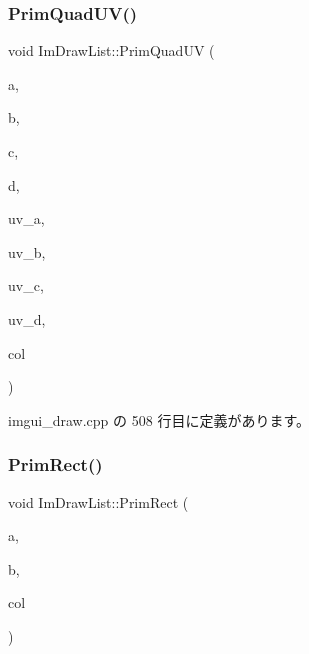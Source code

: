 \subsubsection{\texorpdfstring{Prim\+Quad\+U\+V()}{PrimQuadUV()}}
{\footnotesize\ttfamily void Im\+Draw\+List\+::\+Prim\+Quad\+UV (\begin{DoxyParamCaption}\item[{const \mbox{\hyperlink{struct_im_vec2}{Im\+Vec2}} \&}]{a,  }\item[{const \mbox{\hyperlink{struct_im_vec2}{Im\+Vec2}} \&}]{b,  }\item[{const \mbox{\hyperlink{struct_im_vec2}{Im\+Vec2}} \&}]{c,  }\item[{const \mbox{\hyperlink{struct_im_vec2}{Im\+Vec2}} \&}]{d,  }\item[{const \mbox{\hyperlink{struct_im_vec2}{Im\+Vec2}} \&}]{uv\+\_\+a,  }\item[{const \mbox{\hyperlink{struct_im_vec2}{Im\+Vec2}} \&}]{uv\+\_\+b,  }\item[{const \mbox{\hyperlink{struct_im_vec2}{Im\+Vec2}} \&}]{uv\+\_\+c,  }\item[{const \mbox{\hyperlink{struct_im_vec2}{Im\+Vec2}} \&}]{uv\+\_\+d,  }\item[{\mbox{\hyperlink{imgui_8h_a118cff4eeb8d00e7d07ce3d6460eed36}{Im\+U32}}}]{col }\end{DoxyParamCaption})}



 imgui\+\_\+draw.\+cpp の 508 行目に定義があります。

\mbox{\label{struct_im_draw_list_ae2be093563f1d20b8190b7c423113925}} 
\subsubsection{\texorpdfstring{Prim\+Rect()}{PrimRect()}}
{\footnotesize\ttfamily void Im\+Draw\+List\+::\+Prim\+Rect (\begin{DoxyParamCaption}\item[{const \mbox{\hyperlink{struct_im_vec2}{Im\+Vec2}} \&}]{a,  }\item[{const \mbox{\hyperlink{struct_im_vec2}{Im\+Vec2}} \&}]{b,  }\item[{\mbox{\hyperlink{imgui_8h_a118cff4eeb8d00e7d07ce3d6460eed36}{Im\+U32}}}]{col }\end{DoxyParamCaption})}



